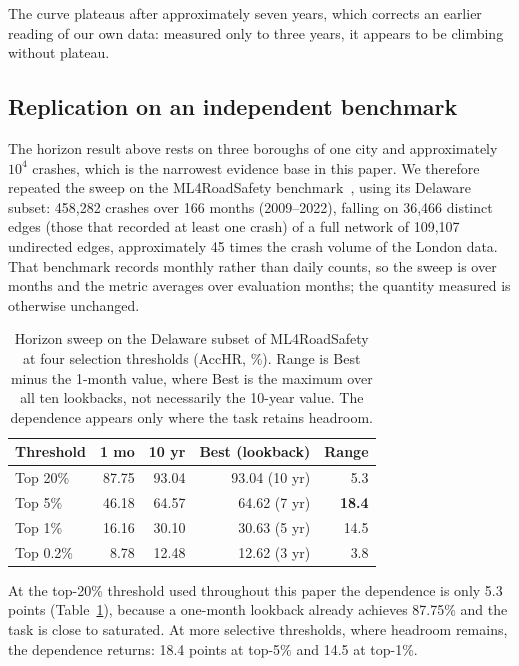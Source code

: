 \documentclass[conference]{IEEEtran}
\begin{document}
The curve plateaus after approximately seven years, which corrects an
earlier reading of our own data: measured only to three years, it appears
to be climbing without plateau.

\subsection{Replication on an independent benchmark}
\label{sec:usrep}

The horizon result above rests on three boroughs of one city and
approximately $10^{4}$ crashes, which is the narrowest evidence base in
this paper. We therefore repeated the sweep on the ML4RoadSafety
benchmark~\cite{nippani2023}, using its Delaware subset: 458,282 crashes
over 166 months (2009--2022), falling on 36,466 distinct edges (those that
recorded at least one crash) of a full network of 109,107 undirected
edges, approximately 45 times the crash volume of the London data. That benchmark records monthly rather than daily counts, so the
sweep is over months and the metric averages over evaluation months; the
quantity measured is otherwise unchanged.

\begin{table}[t]
\caption{Horizon sweep on the Delaware subset of ML4RoadSafety at four
selection thresholds (AccHR, \%). Range is Best minus the 1-month value,
where Best is the maximum over all ten lookbacks, not necessarily the
10-year value. The dependence appears only where the task retains
headroom.}
\label{tab:usrep}
\centering
\small
\begin{tabular}{lrrrr}
\toprule
Threshold & 1 mo & 10 yr & Best (lookback) & Range \\
\midrule
Top 20\% & 87.75 & 93.04 & 93.04 (10 yr) & 5.3 \\
Top 5\% & 46.18 & 64.57 & 64.62 (7 yr) & \textbf{18.4} \\
Top 1\% & 16.16 & 30.10 & 30.63 (5 yr) & 14.5 \\
Top 0.2\% & 8.78 & 12.48 & 12.62 (3 yr) & 3.8 \\
\bottomrule
\end{tabular}
\end{table}

At the top-20\% threshold used throughout this paper the dependence is
only 5.3 points (Table~\ref{tab:usrep}), because a one-month lookback
already achieves 87.75\% and the task is close to saturated. At more
selective thresholds, where headroom remains, the dependence returns: 18.4
points at top-5\% and 14.5 at top-1\%.
\end{document}
